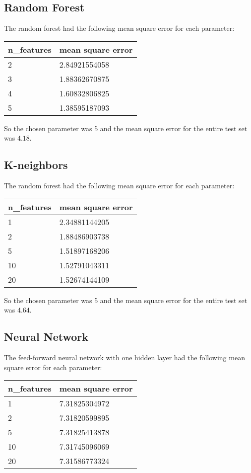\documentclass{article}
\begin{document}
\newpage
\subsection{Random Forest}
The random forest had the following mean square error for each parameter:

\begin{table}[h]
\begin{tabular}{|l|l|}
\hline
\textbf{n\_features} & \textbf{mean square error} \\ \hline
2 & 2.84921554058 \\ \hline
3 & 1.88362670875 \\ \hline
4 & 1.60832806825 \\ \hline
5 & 1.38595187093 \\ \hline
\end{tabular}
\end{table}

So the chosen parameter was 5 and the mean square error for the entire test set was $4.18$.

\subsection{K-neighbors}
The random forest had the following mean square error for each parameter:

\begin{table}[h]
\begin{tabular}{|l|l|}
\hline
\textbf{n\_features} & \textbf{mean square error} \\ \hline
 1 & 2.34881144205 \\ \hline
 2 & 1.88486903738 \\ \hline
 5 & 1.51897168206 \\ \hline
10 & 1.52791043311 \\ \hline
20 & 1.52674144109 \\ \hline
\end{tabular}
\end{table}

So the chosen parameter was 5 and the mean square error for the entire test set was $4.64$.

\subsection{Neural Network}
The feed-forward neural network with one hidden layer had the following mean square error for each parameter:

\begin{table}[h]
\begin{tabular}{|l|l|}
\hline
\textbf{n\_features} & \textbf{mean square error} \\ \hline
 1 & 7.31825304972 \\ \hline
 2 & 7.31820599895 \\ \hline
 5 & 7.31825413878 \\ \hline
10 & 7.31745096069 \\ \hline
20 & 7.31586773324 \\ \hline
\end{tabular}
\end{table}
\end{document}
